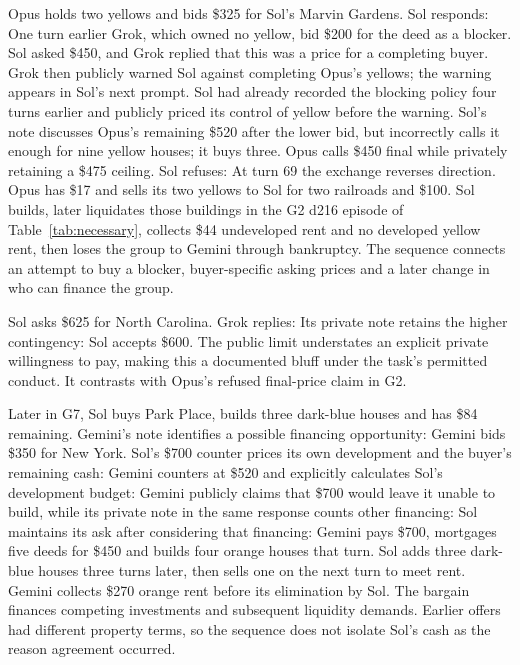 Opus holds two yellows and bids \$325 for Sol's Marvin Gardens. Sol responds:
One turn earlier Grok, which owned no yellow, bid \$200 for the deed as a blocker. Sol asked \$450, and Grok replied that this was a price for a completing buyer. Grok then publicly warned Sol against completing Opus's yellows; the warning appears in Sol's next prompt. Sol had already recorded the blocking policy four turns earlier and publicly priced its control of yellow before the warning. Sol's note discusses Opus's remaining \$520 after the lower bid, but incorrectly calls it enough for nine yellow houses; it buys three. Opus calls \$450 final while privately retaining a \$475 ceiling. Sol refuses:
At turn 69 the exchange reverses direction. Opus has \$17 and sells its two yellows to Sol for two railroads and \$100. Sol builds, later liquidates those buildings in the G2 d216 episode of Table~\ref{tab:necessary}, collects \$44 undeveloped rent and no developed yellow rent, then loses the group to Gemini through bankruptcy. The sequence connects an attempt to buy a blocker, buyer-specific asking prices and a later change in who can finance the group.


Sol asks \$625 for North Carolina. Grok replies:
Its private note retains the higher contingency:
Sol accepts \$600. The public limit understates an explicit private willingness to pay, making this a documented bluff under the task's permitted conduct. It contrasts with Opus's refused final-price claim in G2.

Later in G7, Sol buys Park Place, builds three dark-blue houses and has \$84 remaining. Gemini's note identifies a possible financing opportunity:
Gemini bids \$350 for New York. Sol's \$700 counter prices its own development and the buyer's remaining cash:
Gemini counters at \$520 and explicitly calculates Sol's development budget:
Gemini publicly claims that \$700 would leave it unable to build, while its private note in the same response counts other financing:
Sol maintains its ask after considering that financing:
Gemini pays \$700, mortgages five deeds for \$450 and builds four orange houses that turn. Sol adds three dark-blue houses three turns later, then sells one on the next turn to meet rent. Gemini collects \$270 orange rent before its elimination by Sol. The bargain finances competing investments and subsequent liquidity demands. Earlier offers had different property terms, so the sequence does not isolate Sol's cash as the reason agreement occurred.


